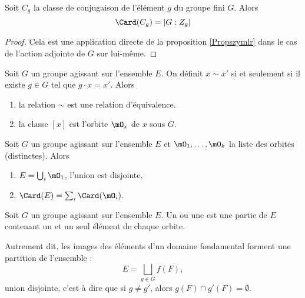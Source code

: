 \begin{corollary}
    Soit \( C_g\) la classe de conjugaison de l'élément  \( g\) du groupe fini \( G\). Alors
    \begin{equation}
        \Card(C_g)=| G:Z_g |
    \end{equation}
\end{corollary}

\begin{proof}
    Cela est une application directe de la proposition \ref{Propszymlr} dans le cas de l'action adjointe de \( G\) sur lui-même.
\end{proof}

\begin{lemma}
    Soit \( G\) un groupe agissant sur l'ensemble \( E\). On définit \( x\sim x'\) si et seulement si il existe \( g\in G\) tel que \( g\cdot x=x'\). Alors
    \begin{enumerate}
        \item
            la relation \( \sim\) est une relation d'équivalence.
        \item
            la classe \( [x]\) est l'orbite \( \mO_x\) de \( x\) sous \( G\).
    \end{enumerate}
\end{lemma}

\begin{corollary} \label{CorARFVMP}
    Soit \( G\) un groupe agissant sur l'ensemble \( E\) et \( \mO_1,\ldots, \mO_k  \) la liste des orbites (distinctes). Alors
    \begin{enumerate}
        \item
            \( E=\bigcup_i\mO_1\), l'union est disjointe,
        \item
            \( \Card(E)=\sum_i\Card(\mO_i)\).
    \end{enumerate}
\end{corollary}

\begin{definition}  \label{DefcSuYxz}
    Soit \( G\) un groupe agissant sur l'ensemble \( E\). Un  ou une  est une partie de \( E\) contenant un et un seul élément de chaque orbite.
\end{definition}
Autrement dit, les images des éléments d'un domaine fondamental forment une partition de l'ensemble :
\begin{equation}
    E=\bigsqcup_{g\in G}f(F),
\end{equation}
union disjointe, c'est à dire que si \( g\neq g'\), alors \( g(F)\cap g'(F)=\emptyset\).

